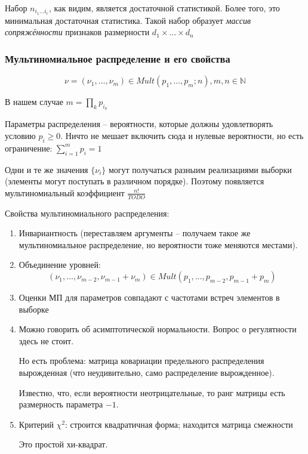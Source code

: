 \documentclass[main.tex]{subfiles}
\begin{document}
Набор $ n_{i_1 \dots i_r} $, как видим, является достаточной статистикой.
Более того, это минимальная достаточная статистика.
Такой набор образует \emph{массив сопряжённости} признаков размерности $ d_1 \times \dots \times d_n $

\subsubsection{Мультиномиальное распределение и его свойства}

\[ \nu = (\nu_1, \dots, \nu_m) \in Mult(p_1, \dots, p_m;n), m,n \in \mathds N \]

В нашем случае $ m = \prod_k p_{i_k} $

Параметры распределения -- вероятности, которые должны удовлетворять условию $ p_i \ge 0 $.
Ничто не мешает включить сюда и нулевые вероятности, но есть ограничение: $ \sum_{i=1}^{m} p_i =1 $

Одни и те же значения $ \{ \nu_i \} $ могут получаться разныим реализациями выборки (элементы могут поступать в различном порядке).
Поэтому появляется мультиномиальный коэффициент
$ \frac{n!}{TODO} $

Свойства мультиномиального распределения:
\begin{enumerate}
	\item Инвариантность (переставляем аргументы -- получаем такое же мультиномиальное распределение, но вероятности тоже меняются местами).
	\item Объединение уровней:
	\[ (\nu_1, \dots, \nu_{m-2}, \nu_{m-1}+\nu_m) \in Mult(p_1, \dots, p_{m-2}, p_{m-1}+p_m) \]
	
	\item Оценки МП для параметров совпадают с частотами встреч элементов в выборке
	\item Можно говорить об асимптотической нормальности.
	Вопрос о регулятности здесь не стоит.
	
	Но есть проблема: матрица ковариации предельного распределения вырожденная (что неудивительно, само распределение вырожденное).
	
	Известно, что, если вероятности неотрицательные, то ранг матрицы есть размерность параметра  $ -1 $. %
	
	\item Критерий $ \chi^2 $: строится квадратичная форма; находится матрица смежности %
	
	Это простой хи-квадрат.
\end{enumerate}
\end{document}
